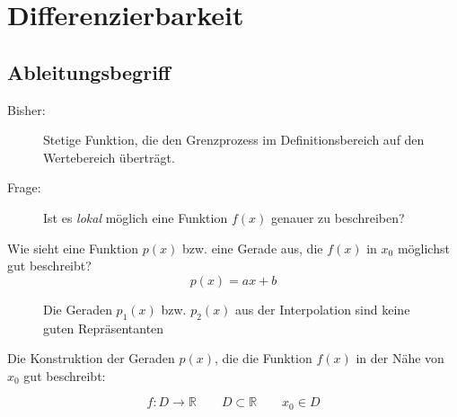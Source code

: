 \newpage
{}
\section{Differenzierbarkeit}
\subsection{Ableitungsbegriff}

\begin{description}
	\item[Bisher:]Stetige Funktion, die den Grenzprozess im Definitionsbereich auf den Wertebereich überträgt.
	\item[Frage:]Ist es \emph{lokal} möglich eine Funktion \( f(x) \) genauer zu beschreiben? 
\end{description}

\noindent Wie sieht eine Funktion \( p(x) \) bzw. eine Gerade aus, die \( f(x) \) in \( x_0 \) möglichst gut beschreibt?
\[
p(x)=ax+b 
\]
\begin{figure}[h]
	\begin{center}
\end{center}
\caption{Die Geraden \( p_1(x) \) bzw. \( p_2(x) \) aus der Interpolation sind keine guten Repräsentanten}
\end{figure}


\noindent Die Konstruktion der Geraden \( p(x) \), die die Funktion \( f(x) \) in der Nähe von \( x_0 \) gut beschreibt:

\[
	f:D\rightarrow\mathbb{R} \qquad D\subset\mathbb{R} \qquad x_0 \in D
\]

